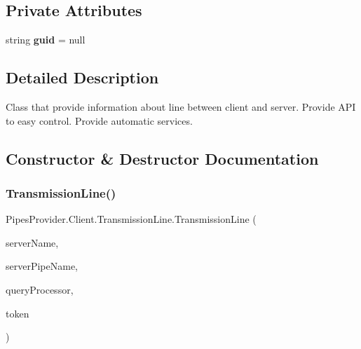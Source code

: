 \subsection*{Private Attributes}
\begin{DoxyCompactItemize}
\item 
\mbox{\label{class_pipes_provider_1_1_client_1_1_transmission_line_a894d0baadc896280da7c0861c2d06b5d}} 
string {\bfseries guid} = null
\end{DoxyCompactItemize}


\subsection{Detailed Description}
Class that provide information about line between client and server. Provide A\+PI to easy control. Provide automatic services. 



\subsection{Constructor \& Destructor Documentation}
\mbox{\label{class_pipes_provider_1_1_client_1_1_transmission_line_a8fe76e563974e7380fe2f717e48d694e}} 
\subsubsection{\texorpdfstring{Transmission\+Line()}{TransmissionLine()}\hspace{0.1cm}{\footnotesize\ttfamily [1/2]}}
{\footnotesize\ttfamily Pipes\+Provider.\+Client.\+Transmission\+Line.\+Transmission\+Line (\begin{DoxyParamCaption}\item[{string}]{server\+Name,  }\item[{string}]{server\+Pipe\+Name,  }\item[{System.\+Action$<$ \mbox{\hyperlink{class_pipes_provider_1_1_client_1_1_transmission_line}{Transmission\+Line}} $>$}]{query\+Processor,  }\item[{ref Safe\+Access\+Token\+Handle}]{token }\end{DoxyParamCaption})}



